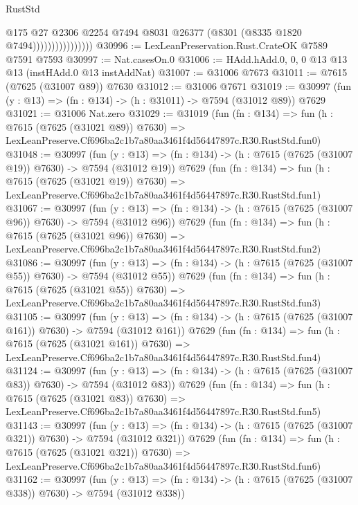 \begin{lexlean}{RustStd}
\begin{coremodule}
                                @175
                                @27
                                @2306
                                @2254
                                @7494
                                @8031
                                @26377
                                (@8301 (@8335 @1820 @7494))))))))))))))))
@30996 := LexLeanPreservation.Rust.CrateOK @7589 @7591 @7593
@30997 := Nat.casesOn.{0}
@31006 := HAdd.hAdd.{0, 0, 0} @13 @13 @13 (instHAdd.{0} @13 instAddNat)
@31007 := @31006 @7673
@31011 := @7615 (@7625 (@31007 @89)) @7630
@31012 := @31006 @7671
@31019 := @30997 (fun (y : @13) => (fn : @134) -> (h : @31011) -> @7594 (@31012 @89)) @7629
@31021 := @31006 Nat.zero
@31029 := @31019
    (fun (fn : @134) =>
    fun (h : @7615 (@7625 (@31021 @89)) @7630) =>
    LexLeanPreserve.Cf696ba2c1b7a80aa3461f4d56447897c.R30.RustStd.fun0)
@31048 := @30997
    (fun (y : @13) => (fn : @134) -> (h : @7615 (@7625 (@31007 @19)) @7630) -> @7594 (@31012 @19))
    @7629
    (fun (fn : @134) =>
    fun (h : @7615 (@7625 (@31021 @19)) @7630) =>
    LexLeanPreserve.Cf696ba2c1b7a80aa3461f4d56447897c.R30.RustStd.fun1)
@31067 := @30997
    (fun (y : @13) => (fn : @134) -> (h : @7615 (@7625 (@31007 @96)) @7630) -> @7594 (@31012 @96))
    @7629
    (fun (fn : @134) =>
    fun (h : @7615 (@7625 (@31021 @96)) @7630) =>
    LexLeanPreserve.Cf696ba2c1b7a80aa3461f4d56447897c.R30.RustStd.fun2)
@31086 := @30997
    (fun (y : @13) => (fn : @134) -> (h : @7615 (@7625 (@31007 @55)) @7630) -> @7594 (@31012 @55))
    @7629
    (fun (fn : @134) =>
    fun (h : @7615 (@7625 (@31021 @55)) @7630) =>
    LexLeanPreserve.Cf696ba2c1b7a80aa3461f4d56447897c.R30.RustStd.fun3)
@31105 := @30997
    (fun (y : @13) => (fn : @134) -> (h : @7615 (@7625 (@31007 @161)) @7630) -> @7594 (@31012 @161))
    @7629
    (fun (fn : @134) =>
    fun (h : @7615 (@7625 (@31021 @161)) @7630) =>
    LexLeanPreserve.Cf696ba2c1b7a80aa3461f4d56447897c.R30.RustStd.fun4)
@31124 := @30997
    (fun (y : @13) => (fn : @134) -> (h : @7615 (@7625 (@31007 @83)) @7630) -> @7594 (@31012 @83))
    @7629
    (fun (fn : @134) =>
    fun (h : @7615 (@7625 (@31021 @83)) @7630) =>
    LexLeanPreserve.Cf696ba2c1b7a80aa3461f4d56447897c.R30.RustStd.fun5)
@31143 := @30997
    (fun (y : @13) => (fn : @134) -> (h : @7615 (@7625 (@31007 @321)) @7630) -> @7594 (@31012 @321))
    @7629
    (fun (fn : @134) =>
    fun (h : @7615 (@7625 (@31021 @321)) @7630) =>
    LexLeanPreserve.Cf696ba2c1b7a80aa3461f4d56447897c.R30.RustStd.fun6)
@31162 := @30997
    (fun (y : @13) => (fn : @134) -> (h : @7615 (@7625 (@31007 @338)) @7630) -> @7594 (@31012 @338))

\end{coremodule}
\end{lexlean}

